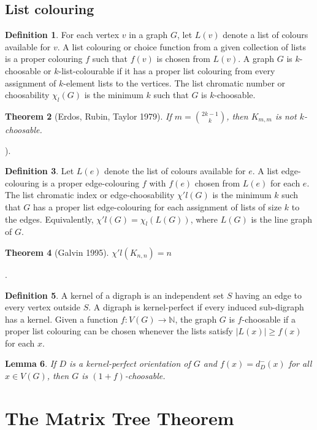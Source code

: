 \documentclass[11pt, fleqn, a4paper, landscape]{article}
\theoremstyle{plain} %
\newtheorem{thm}{Theorem}
\newtheorem{lem}[thm]{Lemma}
\theoremstyle{remark} %
\theoremstyle{definition} %
\newtheorem{defi}[thm]{Definition}
\begin{document}
\begin{multicols}{3}
\subsection{List colouring}

\begin{defi}
For each vertex $v$ in a graph $G$, let $L(v)$ denote a list of colours available for $v$. A list colouring or choice function from a given collection of lists is a proper colouring $f$ such that $f(v)$ is chosen from $L(v)$. A graph $G$ is $k$-choosable or $k$-list-colourable if it has a proper list colouring from every assignment of $k$-element lists to the vertices. The list chromatic number or choosability $\chi_l(G)$ is the minimum $k$ such that $G$ is $k$-choosable.
\end{defi}

\begin{thm}[Erdos, Rubin, Taylor 1979]
If $m = \binom{2k-1}{k}$, then $K_{m,m}$ is not $k$-choosable.
\end{thm}). 

\begin{defi}
Let $L(e)$ denote the list of colours available for $e$. A list edge-colouring is a proper edge-colouring $f$ with $f(e)$ chosen from $L(e)$ for each $e$. The list chromatic index or edge-choosability $\chi' l(G)$ is the minimum $k$ such that $G$ has a proper list edge-colouring for each assignment of lists of size $k$ to the edges. Equivalently, $\chi'
l(G) = \chi_l(L(G))$, where $L(G)$ is the line graph of $G$.
\end{defi}
\addtocounter{thm}{1}
\begin{thm}[Galvin 1995]
$\chi' l(K_{n,n}) = n$
\end{thm}.

\begin{defi}
A kernel of a digraph is an independent set $S$ having an edge to every vertex
outside $S$. A digraph is kernel-perfect if every induced sub-digraph has a kernel. Given a function $f : V (G) \to \mathbb{N}$, the graph $G$ is $f$-choosable if a proper list colouring can be chosen whenever the lists
satisfy $|L(x)|\ge f(x)$ for each $x$.
\end{defi}

\begin{lem}
If $D$ is a kernel-perfect orientation of $G$ and $f(x) = d^-_D(x)$ for all $x \in V (G)$, then $G$ is $(1 + f)$-choosable.
\end{lem}

\section{The Matrix Tree Theorem}


\end{multicols}
\end{document}
